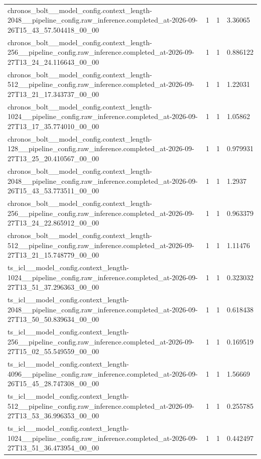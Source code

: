 \begin{tabular}{llll}
chronos\_bolt\_\_model\_config.context\_length-2048\_\_pipeline\_config.raw\_inference.completed\_at-2026-09-26T15\_43\_57.504418\_00\_00 & 1 & 1 & 3.36065 \\
chronos\_bolt\_\_model\_config.context\_length-256\_\_pipeline\_config.raw\_inference.completed\_at-2026-09-27T13\_24\_24.116643\_00\_00 & 1 & 1 & 0.886122 \\
chronos\_bolt\_\_model\_config.context\_length-512\_\_pipeline\_config.raw\_inference.completed\_at-2026-09-27T13\_21\_17.343737\_00\_00 & 1 & 1 & 1.22031 \\
chronos\_bolt\_\_model\_config.context\_length-1024\_\_pipeline\_config.raw\_inference.completed\_at-2026-09-27T13\_17\_35.774010\_00\_00 & 1 & 1 & 1.05862 \\
chronos\_bolt\_\_model\_config.context\_length-128\_\_pipeline\_config.raw\_inference.completed\_at-2026-09-27T13\_25\_20.410567\_00\_00 & 1 & 1 & 0.979931 \\
chronos\_bolt\_\_model\_config.context\_length-2048\_\_pipeline\_config.raw\_inference.completed\_at-2026-09-26T15\_43\_53.773511\_00\_00 & 1 & 1 & 1.2937 \\
chronos\_bolt\_\_model\_config.context\_length-256\_\_pipeline\_config.raw\_inference.completed\_at-2026-09-27T13\_24\_22.865912\_00\_00 & 1 & 1 & 0.963379 \\
chronos\_bolt\_\_model\_config.context\_length-512\_\_pipeline\_config.raw\_inference.completed\_at-2026-09-27T13\_21\_15.748779\_00\_00 & 1 & 1 & 1.11476 \\
ts\_icl\_\_model\_config.context\_length-1024\_\_pipeline\_config.raw\_inference.completed\_at-2026-09-27T13\_51\_37.296363\_00\_00 & 1 & 1 & 0.323032 \\
ts\_icl\_\_model\_config.context\_length-2048\_\_pipeline\_config.raw\_inference.completed\_at-2026-09-27T13\_50\_50.839634\_00\_00 & 1 & 1 & 0.618438 \\
ts\_icl\_\_model\_config.context\_length-256\_\_pipeline\_config.raw\_inference.completed\_at-2026-09-27T15\_02\_55.549559\_00\_00 & 1 & 1 & 0.169519 \\
ts\_icl\_\_model\_config.context\_length-4096\_\_pipeline\_config.raw\_inference.completed\_at-2026-09-26T15\_45\_28.747308\_00\_00 & 1 & 1 & 1.56669 \\
ts\_icl\_\_model\_config.context\_length-512\_\_pipeline\_config.raw\_inference.completed\_at-2026-09-27T13\_53\_36.996353\_00\_00 & 1 & 1 & 0.255785 \\
ts\_icl\_\_model\_config.context\_length-1024\_\_pipeline\_config.raw\_inference.completed\_at-2026-09-27T13\_51\_36.473954\_00\_00 & 1 & 1 & 0.442497 \\

\end{tabular}
